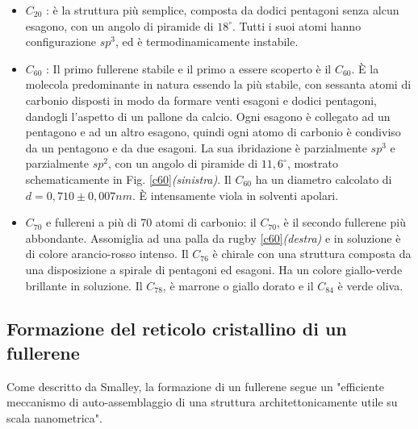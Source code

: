 \documentclass[a4paper,titlepage]{book}
\begin{document}
\begin{itemize}
\item $C_{20}$ : è la struttura più semplice, composta da dodici pentagoni senza alcun esagono, con un angolo di piramide di $18^\circ$. Tutti i suoi atomi hanno configurazione $sp^3$, ed è termodinamicamente instabile.
\item $C_{60}$ : Il primo fullerene stabile e il primo a essere scoperto è il $C_ {60}$. È la molecola predominante in natura essendo la più stabile, con sessanta atomi di carbonio disposti in modo da formare venti esagoni e dodici pentagoni, dandogli l'aspetto di un pallone da calcio. Ogni esagono è collegato ad un pentagono e ad un altro esagono, quindi ogni atomo di carbonio è condiviso da un pentagono e da due esagoni. La sua ibridazione è parzialmente $sp^3$ e parzialmente $sp^2$, con un angolo di piramide di $11,6^\circ$, mostrato schematicamente in Fig. \ref{c60}\textit{(sinistra)}. Il $C_{60}$ ha un diametro calcolato di $d=0,710 \pm 0,007 nm$. È intensamente viola in solventi apolari.
\item $C_{70}$ e fullereni a più di 70 atomi di carbonio: il $C_{70}$, è il secondo fullerene più abbondante. Assomiglia ad una palla da rugby \ref{c60}\textit{(destra)} e in soluzione è di colore arancio-rosso intenso. Il $C_ {76}$ è chirale con una struttura composta da una disposizione a spirale di pentagoni ed esagoni. Ha un colore giallo-verde brillante in soluzione. Il $C_ {78}$, è marrone o giallo dorato e il $C_{84}$ è verde oliva.
\end{itemize}

\subsection{Formazione del reticolo cristallino di un fullerene}
Come descritto da Smalley, la formazione di un fullerene segue un "efficiente meccanismo di auto-assemblaggio di una struttura architettonicamente utile su scala nanometrica". \\
\end{document}
